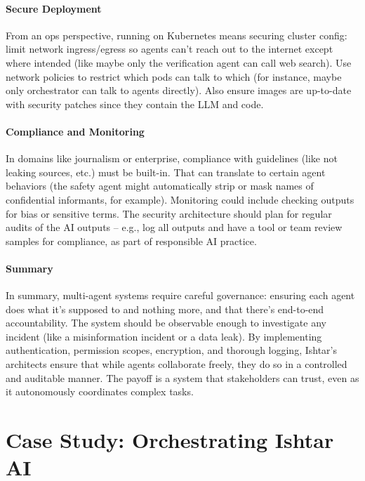 \paragraph*{Secure Deployment}
From an ops perspective, running on Kubernetes means securing cluster config: limit network ingress/egress so agents can’t reach out to the internet except where intended (like maybe only the verification agent can call web search). Use network policies to restrict which pods can talk to which (for instance, maybe only orchestrator can talk to agents directly). Also ensure images are up-to-date with security patches since they contain the LLM and code.

\paragraph*{Compliance and Monitoring}
In domains like journalism or enterprise, compliance with guidelines (like not leaking sources, etc.) must be built-in. That can translate to certain agent behaviors (the safety agent might automatically strip or mask names of confidential informants, for example). Monitoring could include checking outputs for bias or sensitive terms. The security architecture should plan for regular audits of the AI outputs – e.g., log all outputs and have a tool or team review samples for compliance, as part of responsible AI practice.

\paragraph*{Summary}
In summary, multi-agent systems require careful governance: ensuring each agent does what it’s supposed to and nothing more, and that there’s end-to-end accountability. The system should be observable enough to investigate any incident (like a misinformation incident or a data leak). By implementing authentication, permission scopes, encryption, and thorough logging, Ishtar’s architects ensure that while agents collaborate freely, they do so in a controlled and auditable manner. The payoff is a system that stakeholders can trust, even as it autonomously coordinates complex tasks.

\section{Case Study: Orchestrating Ishtar AI}

